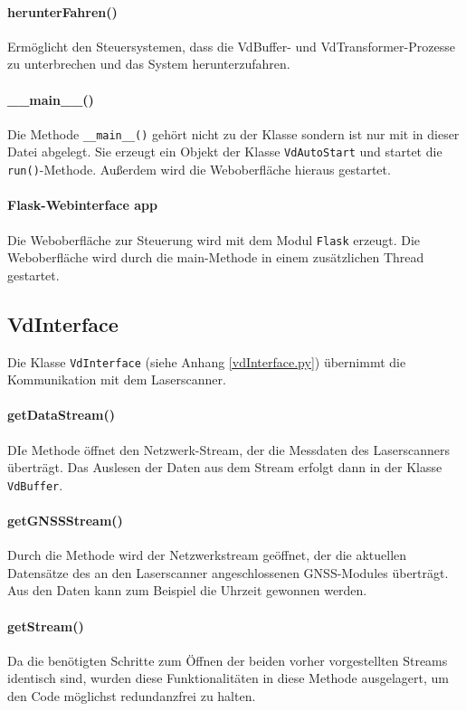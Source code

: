 \documentclass[a4paper,12pt,bibliography=totoc, listof=totoc,titlepage]{scrreprt}
\newcommand{\code}[1]{\texttt{#1}}
\begin{document}
\paragraph{herunterFahren()}
Ermöglicht den Steuersystemen, dass die VdBuffer- und VdTransformer-Prozesse zu unterbrechen und das System herunterzufahren.

\paragraph{\_\_main\_\_()}
Die Methode \code{\_\_main\_\_()} gehört nicht zu der Klasse sondern ist nur mit in dieser Datei abgelegt. Sie erzeugt ein Objekt der Klasse \code{VdAutoStart} und startet die \code{run()}-Methode. Außerdem wird die Weboberfläche hieraus gestartet.

\paragraph{Flask-Webinterface app}
Die Weboberfläche zur Steuerung wird mit dem Modul \code{Flask} erzeugt. Die Weboberfläche wird durch die main-Methode in einem zusätzlichen Thread gestartet.

\subsection{VdInterface}
Die Klasse \code{VdInterface} (siehe Anhang \ref{vdInterface.py}) übernimmt die Kommunikation mit dem Laserscanner.

\paragraph{getDataStream()}
DIe Methode öffnet den Netzwerk-Stream, der die Messdaten des Laserscanners überträgt. Das Auslesen der Daten aus dem Stream erfolgt dann in der Klasse \code{VdBuffer}.

\paragraph{getGNSSStream()}
Durch die Methode wird der Netzwerkstream geöffnet, der die aktuellen Datensätze des an den Laserscanner angeschlossenen GNSS-Modules überträgt. Aus den Daten kann zum Beispiel die Uhrzeit gewonnen werden.

\paragraph{getStream()}
Da die benötigten Schritte zum Öffnen der beiden vorher vorgestellten Streams identisch sind, wurden diese Funktionalitäten in diese Methode ausgelagert, um den Code möglichst redundanzfrei zu halten.
\end{document}
